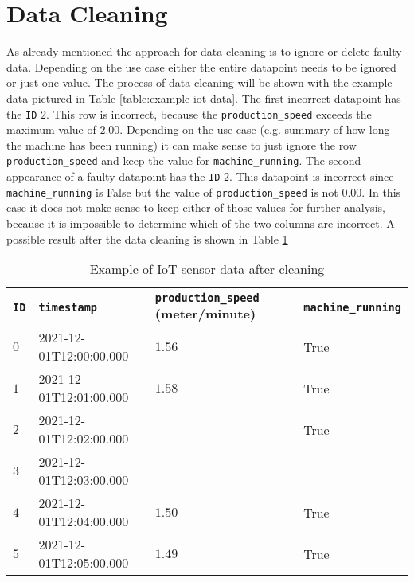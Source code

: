 \section{Data Cleaning}
As already mentioned the approach for data cleaning is to ignore or delete faulty data. Depending on the use case either the entire datapoint needs to be ignored or just one value. The process of data cleaning will be shown with the example data pictured in Table \ref{table:example-iot-data}.
The first incorrect datapoint has the \verb|ID| $2$. This row is incorrect, because the \verb|production_speed| exceeds the maximum value of $2.00$. Depending on the use case (e.g. summary of how long the machine has been running) it can make sense to just ignore the row \verb|production_speed| and keep the value for \verb|machine_running|. The second appearance of a faulty datapoint has the \verb|ID| $2$. This datapoint is incorrect since \verb|machine_running| is False but the value of \verb|production_speed| is not $0.00$. In this case it does not make sense to keep either of those values for further analysis, because it is impossible to determine which of the two columns are incorrect. A possible result after the data cleaning is shown in Table \ref{table:example-iot-data-after-cleaning}
\begin{table}[ht]
\begin{tabular}{|l|l|l|l|}
\hline
\verb|ID| & \verb|timestamp|        & \verb|production_speed| (meter/minute) & \verb|machine_running| \\ \hline
$0$       & 2021-12-01T12:00:00.000 & $1.56$                                 & True                   \\ \hline
$1$       & 2021-12-01T12:01:00.000 & $1.58$                                 & True                   \\ \hline
$2$       & 2021-12-01T12:02:00.000 &                                        & True                   \\ \hline
$3$       & 2021-12-01T12:03:00.000 &                                        &                        \\ \hline
$4$       & 2021-12-01T12:04:00.000 & $1.50$                                 & True                   \\ \hline
$5$       & 2021-12-01T12:05:00.000 & $1.49$                                 & True                   \\ \hline
\end{tabular}
\caption{Example of IoT sensor data after cleaning}
\label{table:example-iot-data-after-cleaning}
\end{table}

